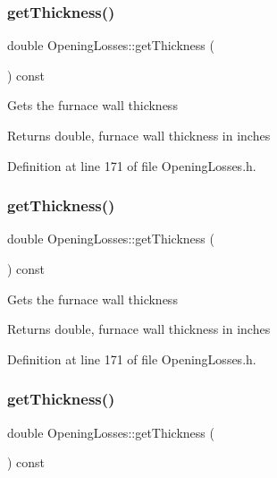 \subsubsection{\texorpdfstring{get\+Thickness()}{getThickness()}\hspace{0.1cm}{\footnotesize\ttfamily [1/3]}}
{\footnotesize\ttfamily double Opening\+Losses\+::get\+Thickness (\begin{DoxyParamCaption}{ }\end{DoxyParamCaption}) const\hspace{0.3cm}{\ttfamily [inline]}}

Gets the furnace wall thickness \begin{DoxyReturn}{Returns}
double, furnace wall thickness in inches 
\end{DoxyReturn}


Definition at line 171 of file Opening\+Losses.\+h.

\mbox{\label{class_opening_losses_aeefdf4431056de65ca84c6dfb24b61e1}} 
\subsubsection{\texorpdfstring{get\+Thickness()}{getThickness()}\hspace{0.1cm}{\footnotesize\ttfamily [2/3]}}
{\footnotesize\ttfamily double Opening\+Losses\+::get\+Thickness (\begin{DoxyParamCaption}{ }\end{DoxyParamCaption}) const\hspace{0.3cm}{\ttfamily [inline]}}

Gets the furnace wall thickness \begin{DoxyReturn}{Returns}
double, furnace wall thickness in inches 
\end{DoxyReturn}


Definition at line 171 of file Opening\+Losses.\+h.

\mbox{\label{class_opening_losses_aeefdf4431056de65ca84c6dfb24b61e1}} 
\subsubsection{\texorpdfstring{get\+Thickness()}{getThickness()}\hspace{0.1cm}{\footnotesize\ttfamily [3/3]}}
{\footnotesize\ttfamily double Opening\+Losses\+::get\+Thickness (\begin{DoxyParamCaption}{ }\end{DoxyParamCaption}) const\hspace{0.3cm}{\ttfamily [inline]}}

